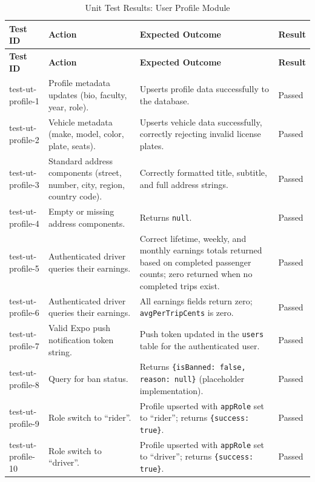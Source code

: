 \small
\begin{longtable}{|p{}|>{\raggedright\arraybackslash}p{}|>{\raggedright\arraybackslash}p{}|p{}|}
\hline
\textbf{Test ID} & \textbf{Action} & \textbf{Expected Outcome} & \textbf{Result} \\
\hline
\endfirsthead

\hline
\textbf{Test ID} & \textbf{Action} & \textbf{Expected Outcome} & \textbf{Result} \\
\hline
\endhead

\hline
\endfoot

\hline
\caption{Unit Test Results: User Profile Module}
\endlastfoot

test-ut-profile-1 & Profile metadata updates (bio, faculty, year, role). & Upserts profile data successfully to the database. & Passed \\
\hline
test-ut-profile-2 & Vehicle metadata (make, model, color, plate, seats). & Upserts vehicle data successfully, correctly rejecting invalid license plates. & Passed \\
\hline
test-ut-profile-3 & Standard address components (street, number, city, region, country code). & Correctly formatted title, subtitle, and full address strings. & Passed \\
\hline
test-ut-profile-4 & Empty or missing address components. & Returns \texttt{null}. & Passed \\
\hline
test-ut-profile-5 & Authenticated driver queries their earnings. & Correct lifetime, weekly, and monthly earnings totals returned based on completed passenger counts; zero returned when no completed trips exist. & Passed \\
\hline
test-ut-profile-6 & Authenticated driver queries their earnings. & All earnings fields return zero; \texttt{avgPerTripCents} is zero. & Passed \\
\hline
test-ut-profile-7 & Valid Expo push notification token string. & Push token updated in the \texttt{users} table for the authenticated user. & Passed \\
\hline
test-ut-profile-8 & Query for ban status. & Returns \texttt{\{isBanned: false, reason: null\}} (placeholder implementation). & Passed \\
\hline
test-ut-profile-9 & Role switch to ``rider''. & Profile upserted with \texttt{appRole} set to ``rider''; returns \texttt{\{success: true\}}. & Passed \\
\hline
test-ut-profile-10 & Role switch to ``driver''. & Profile upserted with \texttt{appRole} set to ``driver''; returns \texttt{\{success: true\}}. & Passed \\
\hline
\end{longtable}

